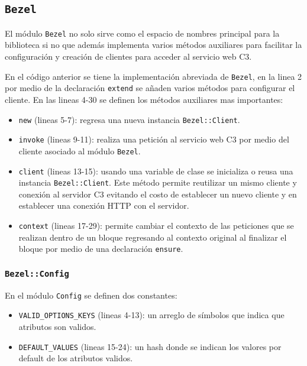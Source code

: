 \subsection{\texttt{Bezel}}

El módulo \texttt{Bezel} no solo sirve como el espacio de nombres principal para la
biblioteca si no que además implementa varios métodos auxiliares para facilitar la
configuración y creación de clientes para acceder al servicio web C3.



En el código anterior se tiene la implementación abreviada de \texttt{Bezel},
en la linea 2 por medio de la declaración \texttt{extend} se añaden
varios métodos para configurar el cliente. En las lineas 4-30 se definen los
métodos auxiliares mas importantes:

\begin{itemize}
\item \texttt{new} (lineas 5-7): regresa una nueva instancia \texttt{Bezel::Client}.
\item \texttt{invoke} (lineas 9-11): realiza una petición al servicio web C3
  por medio del cliente asociado al módulo \texttt{Bezel}.
\item \texttt{client} (lineas 13-15): usando una variable de clase se inicializa o
  reusa una instancia \texttt{Bezel::Client}. Este método permite reutilizar un
  mismo cliente y conexión al servidor C3 evitando el costo de establecer un
  nuevo cliente y en establecer una conexión HTTP con el servidor.
\item \texttt{context} (lineas 17-29): permite cambiar el contexto de las
  peticiones que se realizan dentro de un bloque regresando al contexto original
  al finalizar el bloque por medio de una declaración \texttt{ensure}.
\end{itemize}

\subsubsection{\texttt{Bezel::Config}}



En el módulo \texttt{Config} se definen dos constantes:

\begin{itemize}
\item \texttt{VALID\_OPTIONS\_KEYS} (lineas 4-13): un arreglo de símbolos que indica
  que atributos son validos.
\item \texttt{DEFAULT\_VALUES} (lineas 15-24): un hash donde se indican los valores
  por default de los atributos validos.
\end{itemize}

